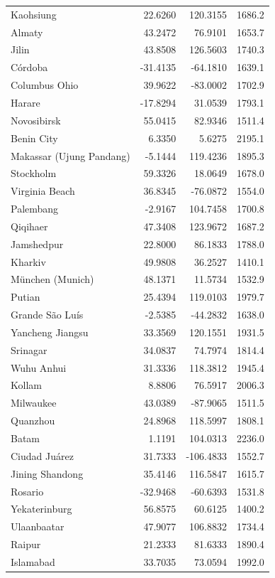 \begin{longtable}{lrrc}
Kaohsiung & 22.6260 & 120.3155 & 1686.2 \\
Almaty & 43.2472 & 76.9101 & 1653.7 \\
Jilin & 43.8508 & 126.5603 & 1740.3 \\
Córdoba & -31.4135 & -64.1810 & 1639.1 \\
Columbus  Ohio & 39.9622 & -83.0002 & 1702.9 \\
Harare & -17.8294 & 31.0539 & 1793.1 \\
Novosibirsk & 55.0415 & 82.9346 & 1511.4 \\
Benin City & 6.3350 & 5.6275 & 2195.1 \\
Makassar (Ujung Pandang) & -5.1444 & 119.4236 & 1895.3 \\
Stockholm & 59.3326 & 18.0649 & 1678.0 \\
Virginia Beach & 36.8345 & -76.0872 & 1554.0 \\
Palembang & -2.9167 & 104.7458 & 1700.8 \\
Qiqihaer & 47.3408 & 123.9672 & 1687.2 \\
Jamshedpur & 22.8000 & 86.1833 & 1788.0 \\
Kharkiv & 49.9808 & 36.2527 & 1410.1 \\
München (Munich) & 48.1371 & 11.5734 & 1532.9 \\
Putian & 25.4394 & 119.0103 & 1979.7 \\
Grande São Luís & -2.5385 & -44.2832 & 1638.0 \\
Yancheng  Jiangsu & 33.3569 & 120.1551 & 1931.5 \\
Srinagar & 34.0837 & 74.7974 & 1814.4 \\
Wuhu  Anhui & 31.3336 & 118.3812 & 1945.4 \\
Kollam & 8.8806 & 76.5917 & 2006.3 \\
Milwaukee & 43.0389 & -87.9065 & 1511.5 \\
Quanzhou & 24.8968 & 118.5997 & 1808.1 \\
Batam & 1.1191 & 104.0313 & 2236.0 \\
Ciudad Juárez & 31.7333 & -106.4833 & 1552.7 \\
Jining  Shandong & 35.4146 & 116.5847 & 1615.7 \\
Rosario & -32.9468 & -60.6393 & 1531.8 \\
Yekaterinburg & 56.8575 & 60.6125 & 1400.2 \\
Ulaanbaatar & 47.9077 & 106.8832 & 1734.4 \\
Raipur & 21.2333 & 81.6333 & 1890.4 \\
Islamabad & 33.7035 & 73.0594 & 1992.0 \\

\end{longtable}
